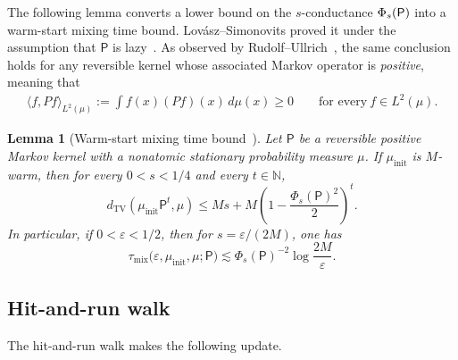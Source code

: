 \documentclass[11pt]{article}
\newtheorem{lemma}[theorem]{Lemma}
\theoremstyle{definition}
\theoremstyle{remark}
\newcommand{\dtv}{d_{\mathrm{TV}}}
\newcommand{\mix}{\mathrm{mix}}
\begin{document}

The following lemma converts a lower bound on the $s$-conductance $\Phi_s({\sf P})$ into a warm-start mixing time bound. Lov\'asz--Simonovits proved it under the assumption that \(\mathsf P\) is lazy~\cite[Corollary~1.6]{LS}. As observed by Rudolf--Ullrich~\cite[Section~1]{RudolfUllrichPositivity}, the same conclusion holds for any reversible kernel whose associated Markov operator is \emph{positive}, meaning that
\begin{align*}
    \langle f,P f\rangle_{L^2(\mu)}:=\int f(x)(Pf)(x)\,d\mu(x)\ge0\qquad \text{for every}~f\in L^2(\mu).
\end{align*}

\begin{lemma}[Warm-start mixing time bound~\cite{LS,RudolfUllrichPositivity}]\label{lem:LS}
Let \(\mathsf P\) be a reversible positive Markov kernel with a
nonatomic stationary probability measure \(\mu\).  If
\(\mu_{\mathrm{init}}\) is \(M\)-warm, then for every
\(0<s<1/4\) and every \(t\in\mathbb N\),
\begin{equation}\label{eq:LS-explicit}
 \dtv(\mu_{\mathrm{init}}\mathsf P^t,\mu)
 \le
 Ms+
 M\left(
   1-\frac{\Phi_s(\mathsf P)^2}{2}
 \right)^t.
\end{equation}
In particular, if \(0<\varepsilon<1/2\), then for $s=\varepsilon/(2M)$,
one has
\begin{equation}\label{eq:LS}
 \tau_{\mix}
 \bigl(
   \varepsilon,\mu_{\mathrm{init}},\mu;\mathsf P
 \bigr)
 \lesssim
 \Phi_s(\mathsf P)^{-2}
 \log\frac{2M}{\varepsilon}.
\end{equation}
\end{lemma}

\subsection{Hit-and-run walk}\label{sec:hit-and-run}

The hit-and-run walk makes the following update.
\end{document}
